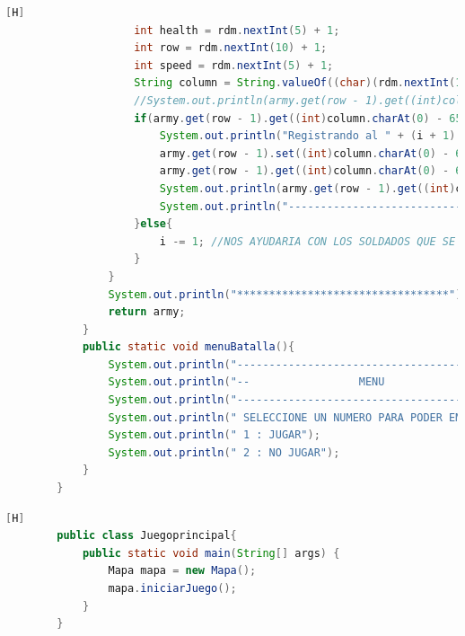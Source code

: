 \documentclass{article}
\begin{document}
\begin{lstlisting}[language=java,caption={Las lineas de codigos de la clase Mapa creada:}][H]
					int health = rdm.nextInt(5) + 1;
					int row = rdm.nextInt(10) + 1;
					int speed = rdm.nextInt(5) + 1;
					String column = String.valueOf((char)(rdm.nextInt(10) + 65)); //REUTILIZAMOS CODIGO DEL ANTERIOR ARCHIVO VIDEOJUEGO2.JAVA YA QUE TENDRIAN LA MISMA FUNCIONALIDAD
					//System.out.println(army.get(row - 1).get((int)column.charAt(0) - 65)); PRUEBA QUE SE HIZO PARA COMPROBAR SI EL OBJETO SE ESTABA DANDO O NO CAPAZ NI EXISTIA  
					if(army.get(row - 1).get((int)column.charAt(0) - 65) == null){
						System.out.println("Registrando al " + (i + 1) + " soldado del Ejercito " + num + "");
						army.get(row - 1).set((int)column.charAt(0) - 65, new Soldado(name, health, row, column));
						army.get(row - 1).get((int)column.charAt(0) - 65).setSpeed(speed);
						System.out.println(army.get(row - 1).get((int)column.charAt(0) - 65).toString());
						System.out.println("---------------------------------");
					}else{
						i -= 1; //NOS AYUDARIA CON LOS SOLDADOS QUE SE REPITEN EN EL MISMO CASILLERO CON TAL QUE NO DEBERIA CONTAR 
					}
				}
				System.out.println("*********************************");
				return army;
			}
			public static void menuBatalla(){
				System.out.println("-------------------------------------------");
				System.out.println("--                 MENU                  --"); 
				System.out.println("-------------------------------------------");
				System.out.println(" SELECCIONE UN NUMERO PARA PODER EMPEZAR O TERMINAR");
				System.out.println(" 1 : JUGAR");
				System.out.println(" 2 : NO JUGAR");
			}
		}
	\end{lstlisting}
	\begin{lstlisting}[language=java,caption={Las lineas de codigos de la clase Juegoprincipal creada:}][H]
		public class Juegoprincipal{
			public static void main(String[] args) {
				Mapa mapa = new Mapa();
				mapa.iniciarJuego();
			}
		}
	\end{lstlisting}
\end{document}
